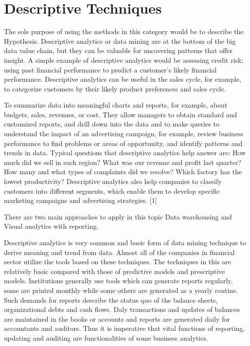 \setlength{\footskip}{8mm}

\chapter{Descriptive Techniques} 
\label{ch:literature-review}

The sole purpose of using the methods in this category would be to describe the Hypothesis. Descriptive analytics or data mining are at the bottom of the big data value chain, but they can be valuable for uncovering patterns that offer insight. A simple example of descriptive analytics would be assessing credit risk; using past financial performance to predict a customer’s likely financial performance. Descriptive analytics can be useful in the sales cycle, for example, to categorize customers by their likely product preferences and sales cycle.

To summarize data into meaningful charts and reports, for example, about budgets, sales, revenues, or cost. They allow managers to obtain standard and customized reports, and drill down into the data and to make queries to understand the impact of an advertising campaign, for example, review business performance to find problems or areas of opportunity, and identify patterns and trends in data. Typical questions that descriptive analytics help answer are: How much did we sell in each region? What was our revenue and profit last quarter? How many and what types of complaints did we resolve? Which factory has the lowest productivity? Descriptive analytics also help companies to classify customers into different segments, which enable them to develop specific marketing campaigns and advertising strategies. [1]

There are two main approaches to apply in this topic Data warehousing and Visual analytics with reporting.

Descriptive analytics is very common and basic form of data mining technique to derive meaning and trend from data. Almost all of the companies in financial sector utilize the tools based on these techniques. The techniques in this are relatively basic compared with those of predictive models and prescriptive models. Institutions generally use tools which can generate reports regularly, some are printed monthly while some others are generated  as a yearly routine. Such demands for reports describe the status quo of the balance sheets, organizational debts and cash flows. Daly transactions and updates of balances are maintained in the books or accounts and reports are generated daily for accountants and auditors. Thus it is imperative that vital functions of reporting, updating and auditing are functionalities of some business analytics.

